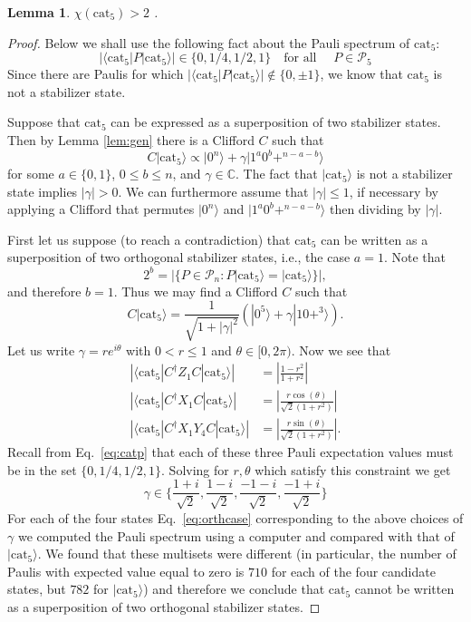 \documentclass[a4paper,onecolumn,11pt,accepted=2021-11-11]{quantumarticle}
\newtheorem{lem}{Lemma}
\newcommand{\cat}{\text{cat}}
\newcommand{\ket}[1]{\ensuremath{\lvert #1 \rangle}}
\begin{document}
\begin{lem}
$\chi(\mathrm{cat}_5) > 2$ .
\end{lem}
\begin{proof}
Below we shall use the following fact about the Pauli spectrum of $\cat_5$:
\begin{equation}
|\langle \cat_5|P|\cat_5\rangle|\in \{0,1/4,1/2,1\} \quad \text{for all } \quad P\in \mathcal{P}_5
\label{eq:catp}
\end{equation}
Since there are Paulis for which $|\langle \cat_5|P|\cat_5\rangle|\notin\{0,\pm 1\}$, we know that $\cat_5$ is not a stabilizer state.

Suppose that $\cat_5$ can be expressed as a superposition of two stabilizer states. Then by Lemma \ref{lem:gen} there is a Clifford $C$ such that 
\[
C|\cat_5\rangle \propto |0^n\rangle+\gamma |1^a0^b+^{n-a-b}\rangle
\]
for some $a\in \{0,1\}$, $0\leq b\leq n$, and $\gamma\in \mathbb{C}$. The fact that $\ket{\cat_5}$ is not a stabilizer state implies $|\gamma|>0$.
We can furthermore assume that $|\gamma| \leq 1$, if necessary by applying a Clifford that permutes $\ket{0^n}$ and $\ket{1^a 0^b +^{n-a-b}}$ then dividing by $|\gamma|$.

First let us suppose (to reach a contradiction) that $\cat_5$ can be written as a superposition of two orthogonal stabilizer states, i.e., the case $a=1$. Note that 
\[
2^b=\left| \{P\in \mathcal{P}_n: P|\cat_5\rangle=|\cat_5\rangle\}\right|,
\]
and therefore $b=1$. Thus we may find a Clifford $C$ such that
\begin{equation}
C|\cat_5\rangle =\frac{1}{\sqrt{1+|\gamma|^2}}\left( |0^5\rangle+\gamma |10+^{3}\rangle\right).
\label{eq:orthcase}
\end{equation}
Let us write $\gamma=re^{i\theta}$ with $0<r\leq 1$ and $\theta\in [0,2\pi)$. Now we see that 
\begin{align*}
\left|\langle \cat_5|C^{\dagger}Z_1C|\cat_5\rangle\right|&=\left|\frac{1-r^2}{1+r^2}\right| \\
\left|\langle \cat_5|C^{\dagger}X_1C|\cat_5\rangle\right|&=\left|\frac{r\cos(\theta)}{\sqrt{2}(1+r^2)}\right| \\
 \left|\langle \cat_5|C^{\dagger}X_1Y_4C|\cat_5\rangle\right|&=\left|\frac{r\sin(\theta)}{\sqrt{2}(1+r^2)}\right|.
\end{align*}
Recall from Eq.~\eqref{eq:catp} that each of these three Pauli expectation values must be in the set $\{0,1/4,1/2, 1\}$. Solving for $r, \theta$ which satisfy this constraint we get
\[
\gamma\in \{ \frac{1+i}{\sqrt{2}}, \frac{1-i}{\sqrt{2}}, \frac{-1-i}{\sqrt{2}},\frac{-1+i}{\sqrt{2}}\}
\]
For each of the four states Eq.~\eqref{eq:orthcase} corresponding to the above choices of $\gamma$ we computed the Pauli spectrum using a computer and compared with that of $|\mathrm{cat}_5\rangle$. We found that these multisets were different (in particular, the number of Paulis with expected value equal to zero is $710$ for each of the four candidate states, but $782$ for $|\mathrm{cat}_5\rangle$) and therefore we conclude that $\cat_5$ cannot be written as a superposition of two orthogonal stabilizer states.



\end{proof}
\end{document}
